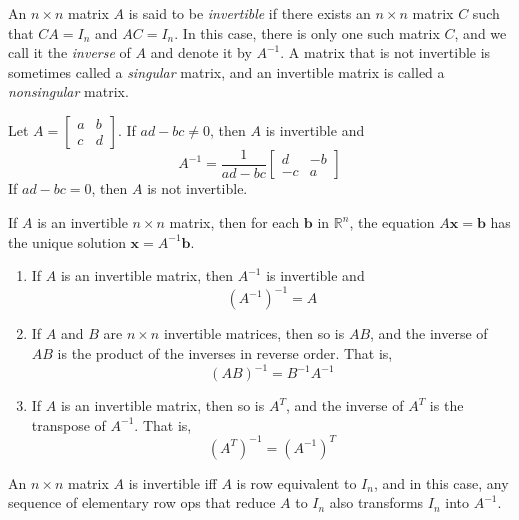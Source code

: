 \documentclass{article}
\begin{document}
\begin{defn}
    An \(n \times n\) matrix \(A\) is said to be \emph{invertible} if there exists an \(n \times n\) matrix \(C\) such that \(CA = I_n\) and \(AC = I_n\). In this case, there is only one such matrix \(C\), and we call it the \emph{inverse} of \(A\) and denote it by \(A^{-1}\).
    A matrix that is not invertible is sometimes called a \emph{singular} matrix, and an invertible matrix is called a \emph{nonsingular} matrix.
\end{defn}

\begin{thm} 
    Let $A=\begin{bmatrix}
        a & b\\
        c & d
    \end{bmatrix}$. If $ad-bc\neq0$, then $A$ is invertible and $$A^{-1}=\frac{1}{ad-bc}\begin{bmatrix}
        d & -b\\
        -c & a
    \end{bmatrix}$$ If $ad-bc=0$, then $A$ is not invertible.
\end{thm}

\begin{thm}
    If $A$ is an invertible $n\times n$ matrix, then for each $\textbf{b}$ in $\mathbb{R}^n$, the equation $A\textbf{x}=\textbf{b}$ has the unique solution $\textbf{x}=A^{-1}\textbf{b}$.
\end{thm}

\begin{thm}
    \begin{enumerate}
        \item[a.] If $A$ is an invertible matrix, then $A^{-1}$ is invertible and $$(A^{-1})^{-1}=A$$
        \item[b.] If $A$ and $B$ are $n\times n$ invertible matrices, then so is $AB$, and the inverse of $AB$ is the product of the inverses in reverse order. That is, $$(AB)^{-1}=B^{-1}A^{-1}$$
        \item[c.] If $A$ is an invertible matrix, then so is $A^T$, and the inverse of $A^T$ is the transpose of $A^{-1}$. That is, $$(A^T)^{-1}=(A^{-1})^T$$
    \end{enumerate}
\end{thm}

\begin{thm}
    An $n\times n$ matrix $A$ is invertible iff $A$ is row equivalent to $I_n$, and in this case, any sequence of elementary row ops that reduce $A$ to $I_n$ also transforms $I_n$ into $A^{-1}$.
\end{thm}
\end{document}
